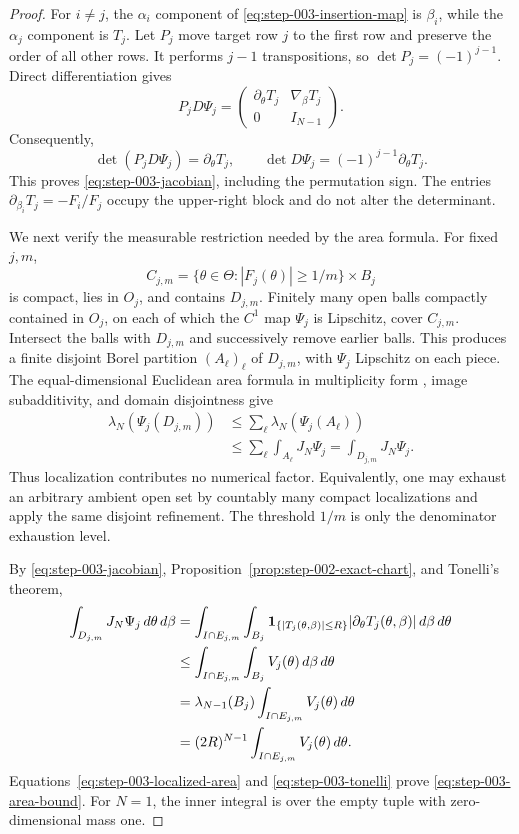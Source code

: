 \begin{proof}
For $i\neq j$, the $\alpha_i$ component of
\eqref{eq:step-003-insertion-map} is $\beta_i$, while the $\alpha_j$
component is $T_j$.  Let $P_j$ move target row $j$ to the first row and
preserve the order of all other rows.  It performs $j-1$ transpositions, so
$\det P_j=(-1)^{j-1}$.  Direct differentiation gives
\[
P_jD\Psi_j
=
\begin{pmatrix}
\partial_\theta T_j&\nabla_\beta T_j\\
0&I_{N-1}
\end{pmatrix}.
\]
Consequently,
\[
\det(P_jD\Psi_j)=\partial_\theta T_j,
\qquad
\det D\Psi_j=(-1)^{j-1}\partial_\theta T_j.
\]
This proves \eqref{eq:step-003-jacobian}, including the permutation sign.
The entries $\partial_{\beta_i}T_j=-F_i/F_j$ occupy the upper-right block
and do not alter the determinant.

We next verify the measurable restriction needed by the area formula.  For
fixed $j,m$,
\[
C_{j,m}
=\{\theta\in\Theta:|F_j(\theta)|\geq1/m\}\times B_j
\]
is compact, lies in $O_j$, and contains $D_{j,m}$.  Finitely many open balls
compactly contained in $O_j$, on each of which the $C^1$ map $\Psi_j$ is
Lipschitz, cover $C_{j,m}$.  Intersect the balls with $D_{j,m}$ and
successively remove earlier balls.  This produces a finite disjoint Borel
partition $(A_\ell)_\ell$ of $D_{j,m}$, with $\Psi_j$ Lipschitz on each
piece.  The equal-dimensional Euclidean area formula in multiplicity form
\citep{azaisWschebor2009}, image subadditivity, and domain disjointness give
\begin{equation}
\begin{aligned}
\lambda_N(\Psi_j(D_{j,m}))
&\leq\sum_\ell\lambda_N(\Psi_j(A_\ell))\\
&\leq\sum_\ell\int_{A_\ell}J_N\Psi_j
=\int_{D_{j,m}}J_N\Psi_j.
\end{aligned}
\label{eq:step-003-localized-area}
\end{equation}
Thus localization contributes no numerical factor.  Equivalently, one may
exhaust an arbitrary ambient open set by countably many compact
localizations and apply the same disjoint refinement.  The threshold $1/m$
is only the denominator exhaustion level.

By \eqref{eq:step-003-jacobian},
Proposition~\ref{prop:step-002-exact-chart}, and Tonelli's theorem,
\begin{equation}
\begin{aligned}
\int_{D_{j,m}}J_N\Psi_j\,d\theta\,d\beta
&=\int_{I\cap E_{j,m}}\int_{B_j}
{\bf1}_{\{|T_j(\theta,\beta)|\leq R\}}
|\partial_\theta T_j(\theta,\beta)|\,d\beta\,d\theta\\
&\leq\int_{I\cap E_{j,m}}\int_{B_j}
V_j(\theta)\,d\beta\,d\theta\\
&=\lambda_{N-1}(B_j)
\int_{I\cap E_{j,m}}V_j(\theta)\,d\theta\\
&=(2R)^{N-1}
\int_{I\cap E_{j,m}}V_j(\theta)\,d\theta.
\end{aligned}
\label{eq:step-003-tonelli}
\end{equation}
Equations~\eqref{eq:step-003-localized-area} and
\eqref{eq:step-003-tonelli} prove \eqref{eq:step-003-area-bound}.  For
$N=1$, the inner integral is over the empty tuple with zero-dimensional
mass one.


\end{proof}
